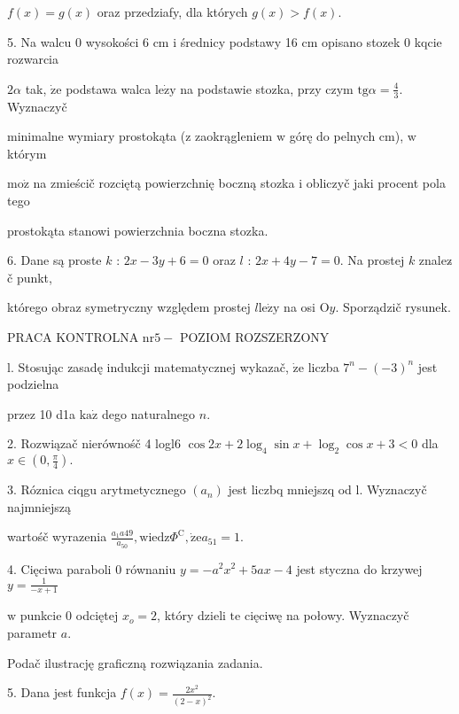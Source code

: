 \documentclass[a4paper,12pt]{article}
\begin{document}
$f(x)=g(x)$ oraz przedziafy, dla których $g(x)>f(x).$

5. Na walcu $0$ wysokości 6 cm $\mathrm{i}$ średnicy podstawy 16 cm opisano stozek $0$ kqcie rozwarcia

$ 2\alpha$ tak, $\dot{\mathrm{z}}\mathrm{e}$ podstawa walca $\mathrm{l}\mathrm{e}\dot{\mathrm{z}}\mathrm{y}$ na podstawie stozka, przy czym $\mathrm{t}\mathrm{g}\alpha= \displaystyle \frac{4}{3}$. Wyznaczyč

minimalne wymiary prostokąta ($\mathrm{z}$ zaokrągleniem $\mathrm{w}$ górę do pelnych cm), $\mathrm{w}$ którym

$\mathrm{m}\mathrm{o}\dot{\mathrm{z}}$ na zmieścič rozciętą powierzchnię boczną stozka $\mathrm{i}$ obliczyč jaki procent pola tego

prostokąta stanowi powierzchnia boczna stozka.

6. Dane są proste $k$ : $2x-3y+6=0$ oraz $l$ : $2x+4y-7=0$. Na prostej $k$ znalez$\acute{}$č punkt,

którego obraz symetryczny względem prostej $l\mathrm{l}\mathrm{e}\dot{\mathrm{z}}\mathrm{y}$ na osi $\mathrm{O}y$. Sporządzič rysunek.





PRACA KONTROLNA $\mathrm{n}\mathrm{r}5-$ POZIOM ROZSZERZONY

l. Stosując zasadę indukcji matematycznej wykazač, $\dot{\mathrm{z}}\mathrm{e}$ liczba $7^{n}-(-3)^{n}$ jest podzielna

przez 10 d1a $\mathrm{k}\mathrm{a}\dot{\mathrm{z}}$ dego naturalnego $n.$

2. Rozwiązač nierównośč 4 logl6 $\cos 2x+2\log_{4}\sin x+\log_{2}\cos x+3<0$ dla $x\displaystyle \in(0,\frac{\pi}{4}).$

3. Róznica ciqgu arytmetycznego $(a_{n})$ jest liczbq mniejszq od l. Wyznaczyč najmniejszą

wartośč wyrazenia $\displaystyle \frac{a_{1}a49}{a_{50}}, \mathrm{w}\mathrm{i}\mathrm{e}\mathrm{d}\mathrm{z}\Phi^{\mathrm{C}}, \dot{\mathrm{z}}\mathrm{e}a_{51}=1.$

4. Cięciwa paraboli $0$ równaniu $y=-a^{2}x^{2}+5ax-4$ jest styczna do krzywej $y=\displaystyle \frac{1}{-x+1}$

$\mathrm{w}$ punkcie $0$ odciętej $x_{o}=2$, który dzieli $\mathrm{t}\mathrm{e}$ cięciwę na połowy. Wyznaczyč parametr $a.$

Podač ilustrację graficzną rozwiązania zadania.

5. Dana jest funkcja $f(x)=\displaystyle \frac{2x^{2}}{(2-x)^{2}}.$
\end{document}
